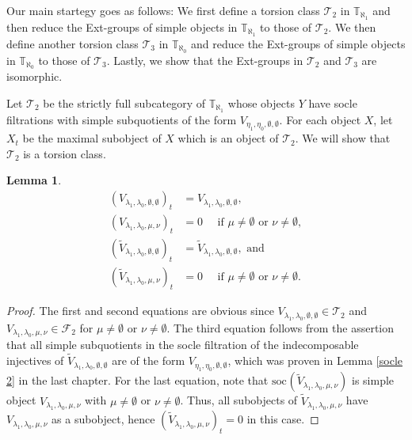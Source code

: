 \documentclass[openany, a4paper]{amsbook}
\newtheorem{lem}[thm]{Lemma}
\theoremstyle{definition}
\numberwithin{equation}{chapter}
\newcommand{\T}[1]{{\mathbb{T}}_{\aleph_{#1}}}
\newcommand{\soc}[2]{\mathrm{soc}^{#1}({#2})}
\begin{document}
Our main startegy goes as follows: We first define a torsion class $\mathcal{T}_2$ in $\T{1}$ and then reduce the Ext-groups of simple objects in $\T{1}$ to those of $\mathcal{T}_2$. We then define another torsion class $\mathcal{T}_3$ in $\T{0}$ and reduce the Ext-groups of simple objects in $\T{0}$ to those of $\mathcal{T}_3$. Lastly, we show that the Ext-groups in $\mathcal{T}_2$ and $\mathcal{T}_3$ are isomorphic.

Let $\mathcal{T}_2$ be the strictly full subcategory of $\T{1}$ whose objects $Y$ have socle filtrations with simple subquotients of the form $V_{\eta_1, \eta_0, \emptyset, \emptyset}$. For each object $X$, let $X_t$ be the maximal subobject of $X$ which is an object of $\mathcal{T}_2$. 
We will show that $\mathcal{T}_2$ is a torsion class. 

\begin{lem}\label{image}
    \begin{align}
        (V_{\lambda_1, \lambda_0, \emptyset, \emptyset})_t &= V_{\lambda_1, \lambda_0, \emptyset, \emptyset},\\
        (V_{\lambda_1, \lambda_0, \mu, \nu})_t &=  0 \quad \text{ if } \mu \neq \emptyset \text{ or }\nu \neq \emptyset,\\
        (\tilde{V}_{\lambda_1, \lambda_0, \emptyset, \emptyset})_t &=  \tilde{V}_{\lambda_1, \lambda_0, \emptyset, \emptyset}, \text{ and }\\
        (\tilde{V}_{\lambda_1, \lambda_0, \mu, \nu})_t &=  0 \quad \text{ if } \mu \neq \emptyset  \text{ or } \nu \neq \emptyset.
    \end{align}
\end{lem}

\begin{proof}
    The first and second equations are obvious since $V_{\lambda_1, \lambda_0, \emptyset, \emptyset} \in \mathcal{T}_2$ and  $V_{\lambda_1, \lambda_0, \mu, \nu} \in \mathcal{F}_2$ for $\mu \neq \emptyset$ or $\nu \neq \emptyset$. The third equation follows from the assertion that all simple subquotients in the socle filtration of the indecomposable injectives of $\tilde{V}_{\lambda_1, \lambda_0, \emptyset, \emptyset}$ are of the form $V_{\eta_1, \eta_0, \emptyset, \emptyset}$, which was proven in Lemma \ref{socle 2} in the last chapter. For the last equation, note that $\soc{}{\tilde{V}_{\lambda_1, \lambda_0, \mu, \nu}}$ is simple object ${V}_{\lambda_1, \lambda_0, \mu, \nu}$ with $\mu \neq \emptyset$ or $\nu \neq \emptyset$. Thus, all subobjects of $\tilde{V}_{\lambda_1, \lambda_0, \mu, \nu}$ have ${V}_{\lambda_1, \lambda_0, \mu, \nu}$ as a subobject, hence $(\tilde{V}_{\lambda_1, \lambda_0, \mu, \nu})_t = 0$ in this case.
\end{proof}
\end{document}
